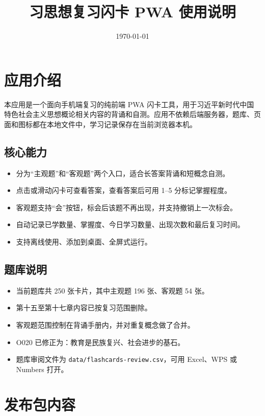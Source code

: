 \documentclass[11pt,a4paper]{ctexart}
\title{\textbf{习思想复习闪卡 PWA 使用说明}}
\author{}
\date{\today}
\begin{document}
\maketitle

\section{应用介绍}

本应用是一个面向手机端复习的纯前端 PWA 闪卡工具，用于习近平新时代中国特色社会主义思想概论相关内容的背诵和自测。应用不依赖后端服务器，题库、页面和图标都在本地文件中，学习记录保存在当前浏览器本机。

\subsection{核心能力}
\begin{itemize}
  \item 分为“主观题”和“客观题”两个入口，适合长答案背诵和短概念自测。
  \item 点击或滑动闪卡可查看答案，查看答案后可用 1--5 分标记掌握程度。
  \item 客观题支持“会”按钮，标会后该题不再出现，并支持撤销上一次标会。
  \item 自动记录已学数量、掌握度、今日学习数量、出现次数和最后复习时间。
  \item 支持离线使用、添加到桌面、全屏式运行。
\end{itemize}

\subsection{题库说明}
\begin{itemize}
  \item 当前题库共 250 张卡片，其中主观题 196 张、客观题 54 张。
  \item 第十五至第十七章内容已按复习范围删除。
  \item 客观题范围控制在背诵手册内，并对重复概念做了合并。
  \item O020 已修正为：教育是民族复兴、社会进步的基石。
  \item 题库审阅文件为 \texttt{data/flashcards-review.csv}，可用 Excel、WPS 或 Numbers 打开。
\end{itemize}

\section{发布包内容}
\end{document}
